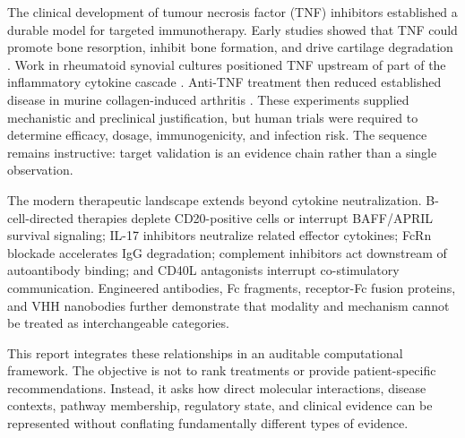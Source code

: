 \documentclass[12pt,a4paper]{article}
\begin{document}
The clinical development of tumour necrosis factor (TNF) inhibitors established a durable model for targeted immunotherapy. Early studies showed that TNF could promote bone resorption, inhibit bone formation, and drive cartilage degradation \cite{bertolini1986,saklatvala1986}. Work in rheumatoid synovial cultures positioned TNF upstream of part of the inflammatory cytokine cascade \cite{brennan1989}. Anti-TNF treatment then reduced established disease in murine collagen-induced arthritis \cite{williams1992}. These experiments supplied mechanistic and preclinical justification, but human trials were required to determine efficacy, dosage, immunogenicity, and infection risk. The sequence remains instructive: target validation is an evidence chain rather than a single observation.

The modern therapeutic landscape extends beyond cytokine neutralization. B-cell-directed therapies deplete CD20-positive cells or interrupt BAFF/APRIL survival signaling; IL-17 inhibitors neutralize related effector cytokines; FcRn blockade accelerates IgG degradation; complement inhibitors act downstream of autoantibody binding; and CD40L antagonists interrupt co-stimulatory communication. Engineered antibodies, Fc fragments, receptor-Fc fusion proteins, and VHH nanobodies further demonstrate that modality and mechanism cannot be treated as interchangeable categories.

This report integrates these relationships in an auditable computational framework. The objective is not to rank treatments or provide patient-specific recommendations. Instead, it asks how direct molecular interactions, disease contexts, pathway membership, regulatory state, and clinical evidence can be represented without conflating fundamentally different types of evidence.
\end{document}
